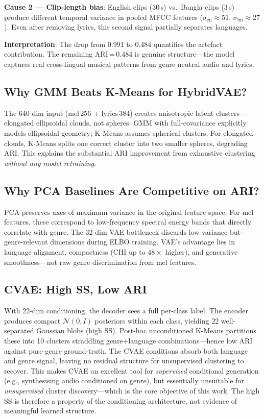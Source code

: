\documentclass{article}
\begin{document}
\textbf{Cause 2 --- Clip-length bias}: English clips (30\,s) vs.\ Bangla clips (3\,s)
produce different temporal variance in pooled MFCC features
($\sigma_\text{en}\!\approx\!51$, $\sigma_\text{bn}\!\approx\!27$). Even after removing
lyrics, this second signal partially separates languages.

\textbf{Interpretation}: The drop from 0.991 to 0.484 quantifies the artefact
contribution. The remaining ARI\,=\,0.484 is genuine structure---the model captures
real cross-lingual musical patterns from genre-neutral audio and lyrics.

\subsection{Why GMM Beats K-Means for HybridVAE?}

The 640-dim input (mel\,256 + lyrics\,384) creates anisotropic latent clusters---elongated
ellipsoidal clouds, not spheres. GMM with full-covariance explicitly models ellipsoidal
geometry; K-Means assumes spherical clusters. For elongated clouds, K-Means splits one
correct cluster into two smaller spheres, degrading ARI. This explains the substantial
ARI improvement from exhaustive clustering \emph{without any model retraining}.

\subsection{Why PCA Baselines Are Competitive on ARI?}

PCA preserves axes of maximum variance in the original feature space. For mel features,
these correspond to low-frequency spectral energy bands that directly correlate with
genre. The 32-dim VAE bottleneck discards low-variance-but-genre-relevant dimensions
during ELBO training. VAE's advantage lies in language alignment, compactness (CHI up
to $48\times$ higher), and generative smoothness---not raw genre discrimination from
mel features.

\subsection{CVAE: High SS, Low ARI}

With 22-dim conditioning, the decoder sees a full per-class label. The encoder produces
compact $\mathcal{N}(0,I)$ posteriors within each class, yielding 22 well-separated
Gaussian blobs (high SS). Post-hoc unconditioned K-Means partitions these into 10
clusters straddling genre+language combinations---hence low ARI against pure-genre
ground-truth. The CVAE conditions absorb both language and genre signal, leaving no
residual structure for unsupervised clustering to recover.
This makes CVAE an excellent tool for \emph{supervised} conditional generation
(e.g., synthesising audio conditioned on genre), but essentially unsuitable for
\emph{unsupervised} cluster discovery---which is the core objective of this work.
The high SS is therefore a property of the conditioning architecture, not evidence
of meaningful learned structure.
\end{document}
